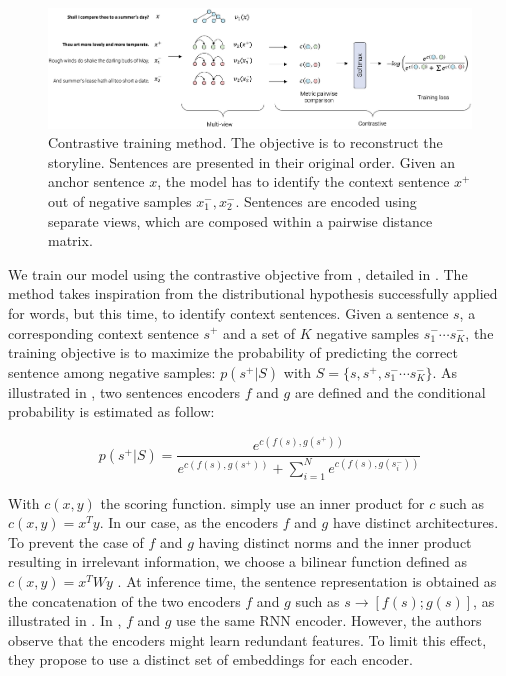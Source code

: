 \begin{figure}[!htb]
\begin{center}
\includegraphics[width=15cm]{images/contrastive-4.png}
\end{center}
\caption{Contrastive training method. The objective is to reconstruct the storyline. Sentences are presented in their original order. Given an anchor sentence $x$, the model has to identify the context sentence $x^+$ out of negative samples $x_1^-, x_2^-$. Sentences are encoded using separate views, which are composed within a pairwise distance matrix. }
\end{figure}

We train our model using the contrastive objective from \textcite{logeswaran_18}, detailed in . The method takes inspiration from the distributional hypothesis successfully applied for words, but this time, to identify context sentences. Given a sentence $s$, a corresponding context sentence $s^+$ and a set of $K$ negative samples $s^-_1 \cdots s^-_K$, the training objective is to maximize the probability of predicting the correct sentence among negative samples: $p(s^+ | S)$ with $S = \{s, s^+, s^-_1 \cdots s^-_K\}$. As illustrated in , two sentences encoders $f$ and $g$ are defined and the conditional probability is estimated as follow:

\[
p(s^+ | S) = \frac{e^{c\left(f(s), g(s^+)\right)}}{e^{c\left(f(s), g(s^+)\right)}+\sum_{i=1}^Ne^{c\left(f(s), g(s^-_i)\right)}}
\]

With $c(x, y)$ the scoring function. \textcite{logeswaran_18} simply use an inner product for $c$ such as $c\left(x, y\right) = x^Ty$. In our case, as the encoders $f$ and $g$ have distinct architectures. To prevent the case of $f$ and $g$ having distinct norms and the inner product resulting in irrelevant information, we choose a bilinear function defined as $c\left(x, y\right) = x^TWy$ \parencite{tschannen_20}. At inference time, the sentence representation is obtained as the concatenation of the two encoders $f$ and $g$ such as $s \rightarrow [f(s);g(s)]$, as illustrated in . In \textcite{logeswaran_18}, $f$ and $g$ use the same RNN encoder. However, the authors observe that the encoders might learn redundant features. To limit this effect, they propose to use a distinct set of embeddings for each encoder. 

